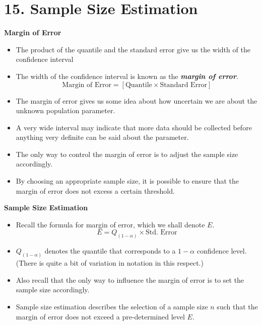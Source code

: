 \documentclass[]{report}
\begin{document}
\chapter{15. Sample Size Estimation}

\textbf{Margin of Error}

\begin{itemize}
\item  The product of the quantile and the standard error give us the width of the confidence interval
\item  The width of the confidence interval is known as the \textbf{\emph{margin of error}}.  \[ \mbox{Margin of Error}  = \left[ \mbox{Quantile} \times \mbox{Standard Error} \right] \]
\item  The margin of error gives us some idea about how uncertain we are about the unknown population parameter. \item  A very wide interval may indicate that more data should be collected before anything very definite can be said about the parameter.
\item  The only way to control the margin of error is to adjust the sample size accordingly.
\item  By choosing an appropriate sample size, it is possible to ensure that the margin of error does not excess a certain threshold.
\end{itemize}










\textbf{Sample Size Estimation}

\begin{itemize} \item  Recall the formula for margin of error, which we shall denote $E$.
\[  E = Q_{(1-\alpha)} \times \mbox{Std. Error}\]

\item  $Q_{(1-\alpha)}$ denotes the quantile that corresponds to a $1-\alpha$ confidence level. (There is quite a bit of variation in notation in this respect.)
\item  Also recall that the only way to influence the margin of error is to set the sample size accordingly.

\item  Sample size estimation describes the selection of a sample size $n$ such that the margin of error does not exceed a pre-determined level $E$.
\end{itemize}
\end{document}
